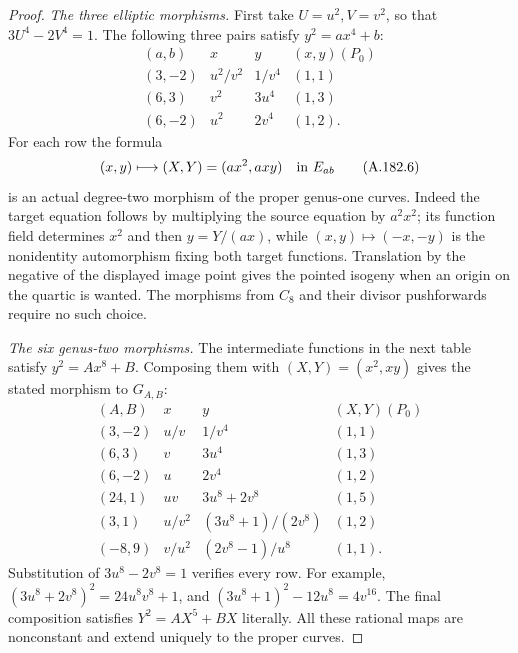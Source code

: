\begin{proof}
\emph{The three elliptic morphisms.}
First take \(U=u^2,V=v^2\), so that
\(3U^4-2V^4=1\).  The following three pairs satisfy
\(y^2=ax^4+b\):
\[
\begin{array}{c|c|c|c}
(a,b)&x&y&(x,y)(P_0)\\ \hline
(3,-2)&u^2/v^2&1/v^4&(1,1)\\
(6,3)&v^2&3u^4&(1,3)\\
(6,-2)&u^2&2v^4&(1,2).
\end{array}
\tag{A.182.5}
\]
For each row the formula
\[
             (x,y)\longmapsto(X,Y)=(ax^2,axy)
                         \quad\hbox{in }E_{ab}
\tag{A.182.6}
\]
is an actual degree-two morphism of the proper genus-one curves.
Indeed the target equation follows by multiplying the source
equation by \(a^2x^2\); its function field determines \(x^2\) and
then \(y=Y/(ax)\), while \((x,y)\mapsto(-x,-y)\) is the
nonidentity automorphism fixing both target functions.  Translation
by the negative of the displayed image point gives the pointed
isogeny when an origin on the quartic is wanted.  The morphisms
from \(C_8\) and their divisor pushforwards require no such choice.

\emph{The six genus-two morphisms.}
The intermediate functions in the next table satisfy
\(y^2=Ax^8+B\).  Composing them with
\((X,Y)=(x^2,xy)\) gives the stated morphism to \(G_{A,B}\):
\[
\begin{array}{c|c|c|c}
(A,B)&x&y&(X,Y)(P_0)\\ \hline
(3,-2)&u/v&1/v^4&(1,1)\\
(6,3)&v&3u^4&(1,3)\\
(6,-2)&u&2v^4&(1,2)\\
(24,1)&uv&3u^8+2v^8&(1,5)\\
(3,1)&u/v^2&(3u^8+1)/(2v^8)&(1,2)\\
(-8,9)&v/u^2&(2v^8-1)/u^8&(1,1).
\end{array}
\tag{A.182.7}
\]
Substitution of \(3u^8-2v^8=1\) verifies every row.  For example,
\((3u^8+2v^8)^2=24u^8v^8+1\), and
\((3u^8+1)^2-12u^8=4v^{16}\).  The final composition satisfies
\(Y^2=AX^5+BX\) literally.  All these rational maps are
nonconstant and extend uniquely to the proper curves.


\end{proof}
